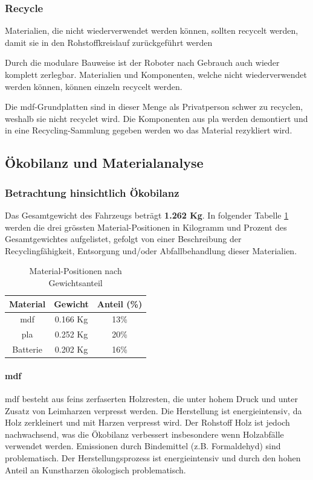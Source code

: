 \subsubsection{Recycle}

Materialien, die nicht wiederverwendet werden können, sollten
recycelt werden, damit sie in den Rohstoffkreislauf zurückgeführt werden

Durch die modulare Bauweise ist der Roboter nach Gebrauch auch wieder komplett zerlegbar. Materialien und Komponenten, welche nicht wiederverwendet werden können, können einzeln recycelt werden.

Die \acrshort{mdf}-Grundplatten sind in dieser Menge als Privatperson schwer zu recyclen, weshalb sie nicht recyclet wird. Die Komponenten aus \acrshort{pla} werden demontiert und in eine Recycling-Sammlung gegeben werden wo das Material rezykliert wird.

\subsection{Ökobilanz und Materialanalyse}

\subsubsection{Betrachtung hinsichtlich Ökobilanz}
Das Gesamtgewicht des Fahrzeugs beträgt \textbf{1.262 Kg}. In folgender Tabelle \ref{tab:kritische-mat} werden die drei grössten Material-Positionen in Kilogramm und Prozent des Gesamtgewichtes aufgelistet, gefolgt von einer Beschreibung der Recyclingfähigkeit, Entsorgung und/oder Abfallbehandlung dieser Materialien.

\begin{table}[h]
    \centering
    \begin{tabular}{c c c}
    \toprule
    Material & Gewicht  & Anteil (\%)\\
    \midrule
    \acrshort{mdf} & 0.166 Kg & 13\% \\
    \acrshort{pla} & 0.252 Kg & 20\% \\
    Batterie & 0.202 Kg & 16\%   \\
    \bottomrule
    \end{tabular}
    \caption{Material-Positionen nach Gewichtsanteil}
    \label{tab:kritische-mat}
\end{table}


\paragraph{\acrlong{mdf}}
\acrshort{mdf} besteht aus feins zerfaserten Holzresten, die unter hohem Druck und unter Zusatz von Leimharzen verpresst werden. Die Herstellung ist energieintensiv, da Holz zerkleinert und mit Harzen verpresst wird. Der Rohstoff Holz ist jedoch nachwachsend, was die Ökobilanz verbessert insbesondere wenn Holzabfälle verwendet werden. Emissionen durch Bindemittel (z.B. Formaldehyd) sind problematisch.\cite{support-2024}
Der Herstellungsprozess ist energieintensiv und durch den hohen Anteil an Kunstharzen ökologisch problematisch.

